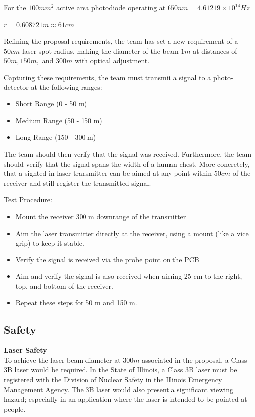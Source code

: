 \documentclass[letterpaper,10pt]{article}
\begin{document}
\begin{spacing}{1.15}
For the $100 mm^2$ active area photodiode operating at $650 nm = 4.61219 × 10^{14} Hz$ 
\begin{center}
	$r = 0.608721 m \approx 61 cm$
\end{center}

Refining the proposal requirements, the team has set a new requirement of a $50 cm$ laser spot radius, making the diameter of the beam $1m$ at distances of $50m, 150m,$ and $300m$ with optical adjustment. 

Capturing these requirements, the team must transmit a signal to a photo-detector at the following ranges:
\begin{itemize}
	\item Short Range (0 - 50 m)
	\item Medium Range (50 - 150 m)
	\item Long Range (150 - 300 m)
\end{itemize}

The team should then verify that the signal was received. Furthermore, the team should verify that the signal spans the width of a human chest. More concretely, that a sighted-in laser transmitter can be aimed at any point within $50 cm$ of the receiver and still register the transmitted signal. 

Test Procedure:

\begin{itemize}
	\item Mount the receiver 300 m downrange of the transmitter
	\item Aim the laser transmitter directly at the receiver, using a mount (like a vice grip) to keep it stable. 
	\item Verify the signal is received via the probe point on the PCB
	\item Aim and verify the signal is also received when aiming 25 cm to the right, top, and bottom of the receiver. 
	\item Repeat these steps for 50 m and 150 m. 
\end{itemize}



\subsection{Safety} \label{section-safety-ethics}
\normalsize\textbf{Laser Safety} \\
To achieve the laser beam diameter at $300 m$ associated in the proposal, a Class 3B laser would be required. In the State of Illinois, a Class 3B laser must be registered with the Division of Nuclear Safety in the Illinois Emergency Management Agency. The 3B laser would also present a significant viewing hazard; especially in an application where the laser is intended to be pointed at people. 


\end{spacing}
\end{document}
